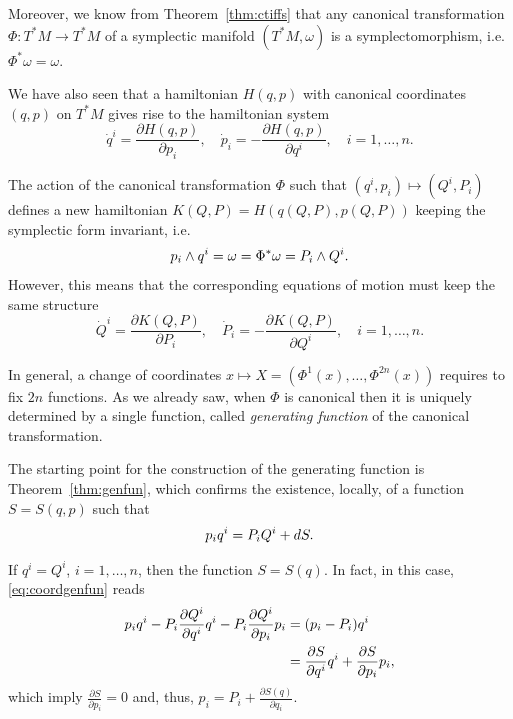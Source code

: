 \documentclass[english,fontsize=11pt,paper=a5,oneside]{scrbook}
\let\d\relax
\DeclareMathOperator{\d}{d}
\theoremstyle{definition}
\newenvironment{remark}
  {\pushQED{\qed}\renewcommand{\qedsymbol}{$\lozenge$}\remarkx}
  {\popQED\endremarkx}
\begin{document}
Moreover, we know from Theorem~\ref{thm:ctiffs} that any canonical transformation $\Phi:T^*M\to T^*M$ of a symplectic manifold $(T^*M,\omega)$ is a symplectomorphism, i.e. $\Phi^* \omega = \omega$.

We have also seen that a hamiltonian $H(q,p)$ with canonical coordinates $(q,p)$ on $T^*M$ gives rise to the hamiltonian system
\begin{equation}
    \dot q^i = \frac{\partial H(q,p)}{\partial p_i},\quad
    \dot p_i = -\frac{\partial H(q,p)}{\partial q^i},\quad
    i=1,\ldots,n.
\end{equation}

The action of the canonical transformation $\Phi$ such that $(q^i, p_i) \mapsto (Q^i, P_i)$ defines a new hamiltonian $K(Q,P) = H(q(Q,P), p(Q,P))$ keeping the symplectic form invariant, i.e.
\begin{equation}
    \d p_i \wedge \d q^i = \omega = \Phi^* \omega = \d P_i \wedge \d Q^i.
\end{equation}
However, this means that the corresponding equations of motion must keep the same structure
\begin{equation}
    \dot Q^i = \frac{\partial K(Q,P)}{\partial P_i},\quad
    \dot P_i = -\frac{\partial K(Q,P)}{\partial Q^i},\quad
    i=1,\ldots,n.
\end{equation}

In general, a change of coordinates $x\mapsto X=(\Phi^1(x), \ldots, \Phi^{2n}(x))$ requires to fix $2n$ functions.
As we already saw, when $\Phi$ is canonical then it is uniquely determined by a single function, called \emph{generating function} of the canonical transformation.

The starting point for the construction of the generating function is Theorem~\ref{thm:genfun}, which confirms the existence, locally, of a function $S=S(q,p)$ such that
\begin{equation}\label{eq:coordgenfun}
    p_i \d q^i = P_i \d Q^i + dS.
\end{equation}

\begin{remark}
    If $q^i = Q^i$, $i=1,\ldots,n$, then the function $S=S(q)$. In fact, in this case, \eqref{eq:coordgenfun} reads
    \begin{align}
        p_i \d q^i - P_i \frac{\partial Q^i}{\partial q^i}\d q^i - P_i \frac{\partial Q^i}{\partial p_i}\d p_i & = (p_i -P_i)\d q^i \\
        & = \frac{\partial S}{\partial q^i}\d q^i + \frac{\partial S}{\partial p_i}\d p_i,
    \end{align}
    which imply $\frac{\partial S}{\partial p_i} = 0$ and, thus, $p_i = P_i + \frac{\partial S(q)}{\partial q_i}$.
\end{remark}
\end{document}
